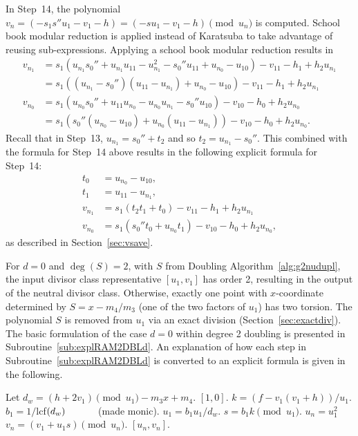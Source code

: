 In Step~14, the polynomial $v_n = (-s_1s''u_1 - v_1 - h) = (-su_1 - v_1 - h)
\pmod{u_n}$ is computed. School book modular reduction is applied instead of
Karatsuba to take advantage of reusing sub-expressions. Applying a school book
modular reduction results in
\begin{align*}
    v_{n_1} &= s_1(u_{n_1}s_0''+ u_{n_1}u_{11} - u_{n_1}^2 - s_0''u_{11}
    + u_{n_0} - u_{10}) - v_{11} - h_1 + h_2u_{n_1}\\
            &= s_1((u_{n_1} - s_0'')(u_{11} - u_{n_1}) + u_{n_0} - u_{10}) - v_{11} - h_1 + h_2u_{n_1}\\
    v_{n_0} &= s_1(u_{n_0}s_0'' + u_{11}u_{n_0} - u_{n_0}u_{n_1} -s_0''u_{10}) - v_{10} - h_0 + h_2u_{n_0}\\
            &= s_1(s_0''(u_{n_0} - u_{10}) + u_{n_0}(u_{11} - u_{n_1})) - v_{10} - h_0 + h_2u_{n_0}.
\end{align*} 
Recall that in Step~13, $u_{n_1} = s_0'' + t_2$ and so $t_2 = u_{n_1} - s_0''$.
This combined with the formula for Step~14 above results in the following
explicit formula for Step~14: 
\begin{align*}  
    t_0 &= u_{n_0} - u_{10},\\
    t_1 &= u_{11} - u_{n_1},\\
    v_{n_1} &= s_1(t_2t_1 + t_0) - v_{11} - h_1 + h_2u_{n_1}\\
    v_{n_0} &= s_1(s_0''t_0 + u_{n_0}t_1) - v_{10} - h_0 + h_2u_{n_0},
\end{align*}
as described in Section~\ref{sec:vsave}. 

For $d=0$ and $\deg(S) = 2$, with $S$ from Doubling
Algorithm~\ref{alg:g2nudupl}, the input divisor class representative $[u_1,v_1]$
has order 2, resulting in the output of the neutral divisor class. Otherwise,
exactly one point with $x$-coordinate determined by $S = x - m_4/m_3$ (one of the two factors of
$u_1$) has two torsion. The polynomial $S$ is removed from $u_1$ via an exact
division (Section~\ref{sec:exactdiv}). The basic formulation of the case $d = 0$
within degree 2 doubling is presented in Subroutine~\ref{sub:explRAM2DBLd}. An
explanation of how each step in Subroutine~\ref{sub:explRAM2DBLd} is converted
to an explicit formula is given in the following. 

\begin{subroutine}[htbp]
\caption{Genus 2 Ramified Model Degree 2 Doubling ($d = 0$) \label{sub:explRAM2DBLd}}
\begin{algorithmic}[1]
\State Let $d_w = (h + 2v_1) \pmod{u_1} -m_3x + m_4.$
 \hspace{1pt} \Return $[1,0]$.
\EndIf
\State $k = (f - v_1(v_1 + h))/u_1$.
\State $b_1 = 1/$lcf$(d_w) \quad\quad\quad$ (made monic).
\State $u_1 = b_1u_1/d_w$.
\State $s = b_1k \pmod{u_1}$.
\State $u_n = u_1^2$
\State $v_n = (v_1 + u_1s) \pmod{u_n}$.
\State \Return $[u_n,v_n]$.
\end{algorithmic}
\end{subroutine}

